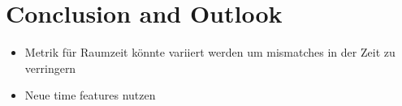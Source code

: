 \chapter{Conclusion and Outlook}
%

\begin{itemize}
  \item Metrik für Raumzeit könnte variiert werden um mismatches in der Zeit zu verringern
  \item Neue time features nutzen
\end{itemize}
